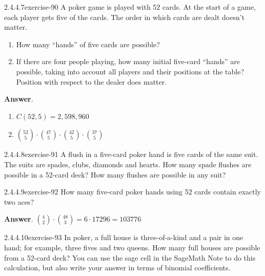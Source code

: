 \documentclass[twoside,10pt,]{book}
\numberwithin{equation}{section}
\begin{document}
\begin{divisionsolution}{2.4.4.7}{}{exercise-90}%
\hypertarget{p-820}{}%
A poker game is played with 52 cards.  At the start of a game, each player gets five of the cards.  The order in which cards are dealt doesn't matter.\leavevmode%
\begin{enumerate}[label=(\alph*)]
\item\hypertarget{li-463}{}\hypertarget{p-821}{}%
How many ``hands'' of five cards are possible?%
\item\hypertarget{li-464}{}\hypertarget{p-822}{}%
If there are four people playing, how many initial five-card ``hands'' are possible, taking into account all players and their positions at the table?  Position with respect to the dealer does matter.%
\end{enumerate}
%
\par\smallskip%
\noindent\textbf{Answer}.\quad%
\hypertarget{p-823}{}%
\leavevmode%
\begin{enumerate}[label=(\alph*)]
\item\hypertarget{li-465}{}\hypertarget{p-824}{}%
\(C(52,5)=2,598,960\)%
\item\hypertarget{li-466}{}\hypertarget{p-825}{}%
\(\binom{52}{5}\cdot \binom{47}{5}\cdot \binom{42}{5}\cdot \binom{37}{5}\)%
\end{enumerate}
%
\end{divisionsolution}%
\begin{divisionsolution}{2.4.4.8}{}{exercise-91}%
\hypertarget{p-826}{}%
A flush in a five-card poker hand is five cards of the same suit. The suits are spades, clubs, diamonds and hearts.  How many spade flushes are possible in a 52-card deck? How many flushes are possible in any suit?%
\end{divisionsolution}%
\begin{divisionsolution}{2.4.4.9}{}{exercise-92}%
\hypertarget{p-827}{}%
How many five-card poker hands using 52 cards contain exactly two aces?%
\par\smallskip%
\noindent\textbf{Answer}.\quad%
\hypertarget{p-828}{}%
\(\binom{4}{2} \cdot \binom{48}{3} = 6 \cdot 17296=103776\)%
\end{divisionsolution}%
\begin{divisionsolution}{2.4.4.10}{}{exercise-93}%
\hypertarget{p-829}{}%
In poker, a full house is three-of-a-kind and a pair in one hand; for example, three fives and two queens. How many full houses are possible from a 52-card deck?  You can use the sage cell in the SageMath Note to do this calculation, but also write your answer in terms of binomial coefficients.%
\end{divisionsolution}%
\end{document}
